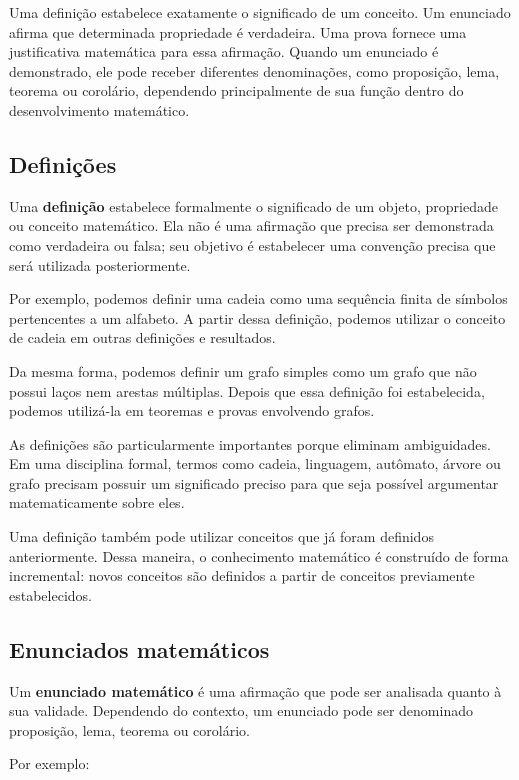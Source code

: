\documentclass[
  brazilian,
  letterpaper,
]{book}
\theoremstyle{plain}
\theoremstyle{definition}
\theoremstyle{remark}
\begin{document}
Uma definição estabelece exatamente o significado de um conceito. Um
enunciado afirma que determinada propriedade é verdadeira. Uma prova
fornece uma justificativa matemática para essa afirmação. Quando um
enunciado é demonstrado, ele pode receber diferentes denominações, como
proposição, lema, teorema ou corolário, dependendo principalmente de sua
função dentro do desenvolvimento matemático.

\subsection{Definições}\label{definiuxe7uxf5es}

Uma \textbf{definição} estabelece formalmente o significado de um
objeto, propriedade ou conceito matemático. Ela não é uma afirmação que
precisa ser demonstrada como verdadeira ou falsa; seu objetivo é
estabelecer uma convenção precisa que será utilizada posteriormente.

Por exemplo, podemos definir uma cadeia como uma sequência finita de
símbolos pertencentes a um alfabeto. A partir dessa definição, podemos
utilizar o conceito de cadeia em outras definições e resultados.

Da mesma forma, podemos definir um grafo simples como um grafo que não
possui laços nem arestas múltiplas. Depois que essa definição foi
estabelecida, podemos utilizá-la em teoremas e provas envolvendo grafos.

As definições são particularmente importantes porque eliminam
ambiguidades. Em uma disciplina formal, termos como cadeia, linguagem,
autômato, árvore ou grafo precisam possuir um significado preciso para
que seja possível argumentar matematicamente sobre eles.

Uma definição também pode utilizar conceitos que já foram definidos
anteriormente. Dessa maneira, o conhecimento matemático é construído de
forma incremental: novos conceitos são definidos a partir de conceitos
previamente estabelecidos.

\subsection{Enunciados matemáticos}\label{enunciados-matemuxe1ticos}

Um \textbf{enunciado matemático} é uma afirmação que pode ser analisada
quanto à sua validade. Dependendo do contexto, um enunciado pode ser
denominado proposição, lema, teorema ou corolário.

Por exemplo:
\end{document}
